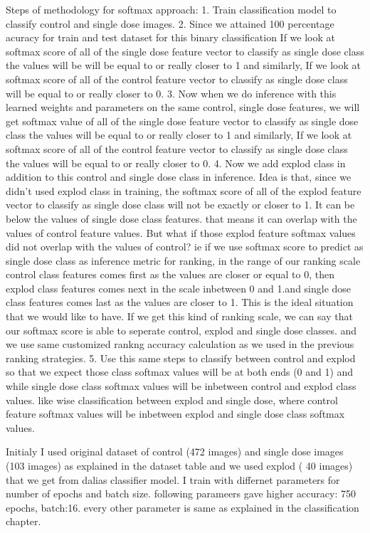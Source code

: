 Steps of methodology for softmax approach:
1. Train classification model to classify control and single dose images.
2. Since we attained 100 percentage acuracy for train and test dataset for this binary classification If we look at softmax score of all of the single dose feature vector to classify as single dose class the values will be will be equal to  or really closer to 1 and similarly, If we look at softmax score of all of the control feature vector to classify as single dose class will be equal to or really closer to 0.
3. Now when we do inference with this learned weights and parameters on the same control, single dose features, we will get   softmax value of all of the single dose feature vector to classify as single dose class the values will be equal to  or really closer to 1 and similarly, If we look at softmax score of all of the control feature vector to classify as single dose class the values will be equal to or really closer to 0.
4. Now we add explod class in addition to this control and single dose class in inference. Idea is that, since we didn't used explod class in training, the softmax score of all of the explod feature vector to classify as single dose class  will not be exactly or closer to 1. It can be below  the values of single dose class features. that  means it can overlap with the values of control feature values. But what if those explod feature softmax values did not overlap with the values of control? ie if we use softmax score to predict as single dose class as inference metric for ranking, in the range of our ranking scale control class features comes first as the values are closer or equal to 0, then explod class features comes next in the scale inbetween 0 and 1.and single dose class features comes last as the values are closer to 1. This is the ideal situation that we would like to have. If we get this kind of ranking scale, we can say that our softmax score is able to seperate control, explod and single dose classes. and we use same customized rankng accuracy calculation as we used in the previous ranking strategies.
5. Use this same steps to classify between control and explod so that we expect those class softmax values will be at both ends (0 and 1) and while single dose class softmax values will be inbetween control and explod class values. like wise classification between explod and single dose, where control feature softmax values will be inbetween explod and single dose class softmax values.

Initialy I used original dataset of control (472 images) and single dose images (103 images) as explained in the dataset table and we used explod ( 40 images) that we get from dalias classifier model.
I train with differnet parameters for  number of epochs and batch size. following parameers gave higher accuracy: 750 epochs, batch:16. every other parameter is same as explained in the classification chapter.


